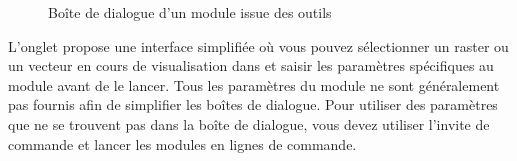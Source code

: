 {\begin{figure}[ht]
\centering
   \hspace{0.2cm}
    \hspace{0.2cm}
 \caption{Boîte de dialogue d'un module issue des outils \grass \nixcaption}\label{fig:grass_module_dialog}  
\end{figure}


L'onglet  propose une interface simplifiée où vous pouvez sélectionner un raster ou un vecteur en cours de visualisation dans \qg et
saisir les paramètres spécifiques au module avant de le lancer. Tous les paramètres du module ne sont généralement pas fournis afin de simplifier
les boîtes de dialogue. Pour utiliser des paramètres que ne se trouvent pas dans la boîte de dialogue, vous devez utiliser l'invite de commande
et lancer les modules en lignes de commande.


}
